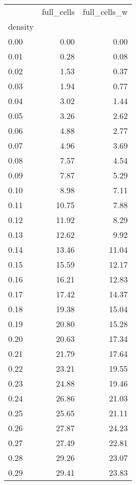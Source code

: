 \begin{tabular}{lrr}
\toprule
{} &  full\_cells &  full\_cells\_w \\
density &             &               \\
\midrule
0.00    &        0.00 &          0.00 \\
0.01    &        0.28 &          0.08 \\
0.02    &        1.53 &          0.37 \\
0.03    &        1.94 &          0.77 \\
0.04    &        3.02 &          1.44 \\
0.05    &        3.26 &          2.62 \\
0.06    &        4.88 &          2.77 \\
0.07    &        4.96 &          3.69 \\
0.08    &        7.57 &          4.54 \\
0.09    &        7.87 &          5.29 \\
0.10    &        8.98 &          7.11 \\
0.11    &       10.75 &          7.88 \\
0.12    &       11.92 &          8.29 \\
0.13    &       12.62 &          9.92 \\
0.14    &       13.46 &         11.04 \\
0.15    &       15.59 &         12.17 \\
0.16    &       16.21 &         12.83 \\
0.17    &       17.42 &         14.37 \\
0.18    &       19.38 &         15.04 \\
0.19    &       20.80 &         15.28 \\
0.20    &       20.63 &         17.34 \\
0.21    &       21.79 &         17.64 \\
0.22    &       23.21 &         19.55 \\
0.23    &       24.88 &         19.46 \\
0.24    &       26.86 &         21.03 \\
0.25    &       25.65 &         21.11 \\
0.26    &       27.87 &         24.23 \\
0.27    &       27.49 &         22.81 \\
0.28    &       29.26 &         23.07 \\
0.29    &       29.41 &         23.83 \\
\bottomrule
\end{tabular}
